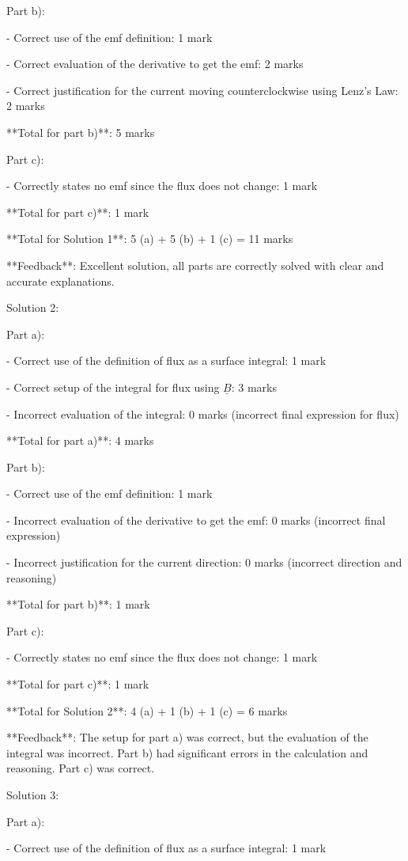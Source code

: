 \documentclass[a4paper,11pt]{article}
\begin{document}
Part b):

- Correct use of the emf definition: 1 mark

- Correct evaluation of the derivative to get the emf: 2 marks

- Correct justification for the current moving counterclockwise using Lenz's Law: 2 marks

**Total for part b)**: 5 marks

Part c):

- Correctly states no emf since the flux does not change: 1 mark

**Total for part c)**: 1 mark

**Total for Solution 1**: 5 (a) + 5 (b) + 1 (c) = 11 marks

**Feedback**: Excellent solution, all parts are correctly solved with clear and accurate explanations.

Solution 2:

Part a):

- Correct use of the definition of flux as a surface integral: 1 mark

- Correct setup of the integral for flux using \( \underline{B} \): 3 marks

- Incorrect evaluation of the integral: 0 marks (incorrect final expression for flux)

**Total for part a)**: 4 marks

Part b):

- Correct use of the emf definition: 1 mark

- Incorrect evaluation of the derivative to get the emf: 0 marks (incorrect final expression)

- Incorrect justification for the current direction: 0 marks (incorrect direction and reasoning)

**Total for part b)**: 1 mark

Part c):

- Correctly states no emf since the flux does not change: 1 mark

**Total for part c)**: 1 mark

**Total for Solution 2**: 4 (a) + 1 (b) + 1 (c) = 6 marks

**Feedback**: The setup for part a) was correct, but the evaluation of the integral was incorrect. Part b) had significant errors in the calculation and reasoning. Part c) was correct.

Solution 3:

Part a):

- Correct use of the definition of flux as a surface integral: 1 mark
\end{document}
